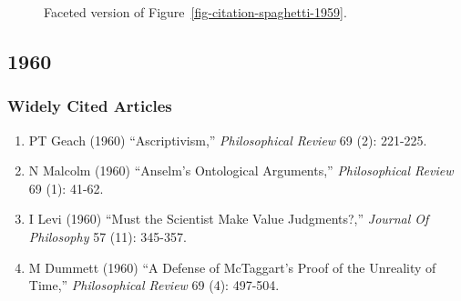 \documentclass[
  10pt,
  letterpaper,
  DIV=11,
  numbers=noendperiod,
  twoside]{scrartcl}
\providecommand{\tightlist}{%
  \setlength{\itemsep}{0pt}\setlength{\parskip}{0pt}}\usepackage{longtable,booktabs,array}
\begin{document}
\begin{figure}


\caption{\label{fig-citation-facet-1959}Faceted version of
Figure~\ref{fig-citation-spaghetti-1959}.}

\end{figure}%

\newpage

\subsection{1960}\label{sec-s1960}

\subsubsection*{Widely Cited Articles}\label{widely-cited-articles-4}

\begin{enumerate}
\def\labelenumi{\arabic{enumi}.}
\tightlist
\item
  PT Geach (1960) ``Ascriptivism,'' \emph{Philosophical Review} 69 (2):
  221-225.
\item
  N Malcolm (1960) ``Anselm's Ontological Arguments,''
  \emph{Philosophical Review} 69 (1): 41-62.
\item
  I Levi (1960) ``Must the Scientist Make Value Judgments?,''
  \emph{Journal Of Philosophy} 57 (11): 345-357.
\item
  M Dummett (1960) ``A Defense of McTaggart's Proof of the Unreality of
  Time,'' \emph{Philosophical Review} 69 (4): 497-504.
\end{enumerate}
\end{document}
